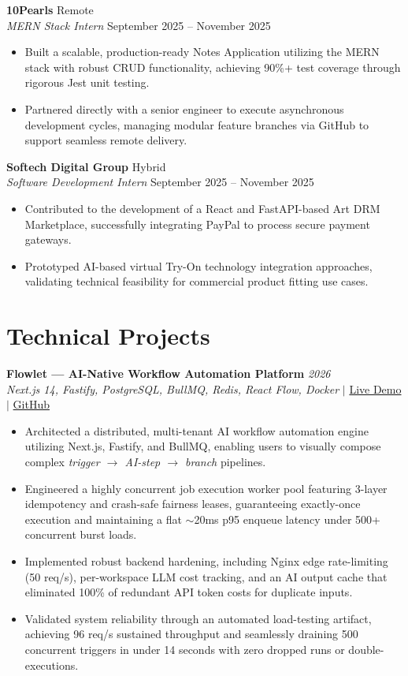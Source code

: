 \documentclass[11pt, a4paper]{article}
\begin{document}
\textbf{10Pearls} \hfill Remote \\
\textit{MERN Stack Intern} \hfill September 2025 -- November 2025
\begin{itemize}[leftmargin=0.25in, itemsep=2pt]
    \item Built a scalable, production-ready Notes Application utilizing the MERN stack with robust CRUD functionality, achieving 90\%+ test coverage through rigorous Jest unit testing.
    \item Partnered directly with a senior engineer to execute asynchronous development cycles, managing modular feature branches via GitHub to support seamless remote delivery.
\end{itemize}

\textbf{Softech Digital Group} \hfill Hybrid \\
\textit{Software Development Intern} \hfill September 2025 -- November 2025
\begin{itemize}[leftmargin=0.25in, itemsep=2pt]
    \item Contributed to the development of a React and FastAPI-based Art DRM Marketplace, successfully integrating PayPal to process secure payment gateways.
    \item Prototyped AI-based virtual Try-On technology integration approaches, validating technical feasibility for commercial product fitting use cases.
\end{itemize}

\section*{Technical Projects}

\textbf{Flowlet — AI-Native Workflow Automation Platform} \hfill \textit{2026} \\
\textit{Next.js 14, Fastify, PostgreSQL, BullMQ, Redis, React Flow, Docker} $|$ \href{http://flowlet-automate.vercel.app/}{Live Demo} $|$ \href{https://github.com/SShayanHussain/flowlet}{GitHub}
\begin{itemize}[leftmargin=0.25in, itemsep=2pt]
    \item Architected a distributed, multi-tenant AI workflow automation engine utilizing Next.js, Fastify, and BullMQ, enabling users to visually compose complex \textit{trigger $\rightarrow$ AI-step $\rightarrow$ branch} pipelines.
    \item Engineered a highly concurrent job execution worker pool featuring 3-layer idempotency and crash-safe fairness leases, guaranteeing exactly-once execution and maintaining a flat $\sim$20ms p95 enqueue latency under 500+ concurrent burst loads.
    \item Implemented robust backend hardening, including Nginx edge rate-limiting (50 req/s), per-workspace LLM cost tracking, and an AI output cache that eliminated 100\% of redundant API token costs for duplicate inputs.
    \item Validated system reliability through an automated load-testing artifact, achieving 96 req/s sustained throughput and seamlessly draining 500 concurrent triggers in under 14 seconds with zero dropped runs or double-executions.
\end{itemize}
\end{document}
